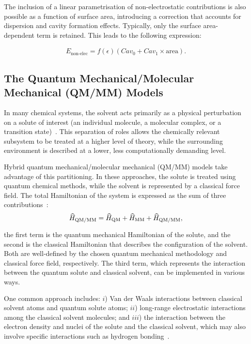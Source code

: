 The inclusion of a linear parametrisation of non-electrostatic contributions is
also possible as a function of surface area, introducing a correction that
accounts for dispersion and cavity formation effects. Typically, only the
surface area-dependent term is retained. This leads to the following
expression:

\begin{align}
  E_\text{non-elec} = f(\epsilon)\left(Cav_0 + Cav_1\times\text{area}\right).
\end{align}

\subsection{The Quantum Mechanical/Molecular Mechanical (QM/MM) Models}

In many chemical systems, the solvent acts primarily as a physical
perturbation on a solute of interest (an individual molecule, a
molecular complex, or a transition state)~\cite{Monard2017}. This separation of
roles allows the chemically relevant subsystem to be treated at a higher level
of theory, while the surrounding environment is described at a lower, less
computationally demanding level.

Hybrid quantum mechanical/molecular mechanical (QM/MM) models take advantage of
this partitioning. In these approaches, the solute is treated using quantum
chemical methods, while the solvent is represented by a classical force field.
The total Hamiltonian of the system is expressed as the sum of three
contributions~\cite{Monard2003}:
%
\begin{align}
  \widehat{H}_\text{QM/MM} = \widehat{H}_\text{QM} + \widehat{H}_\text{MM} + \widehat{H}_\text{QM/MM},
\end{align}

\noindent the first term is the quantum mechanical Hamiltonian of the solute, and the
second is the classical Hamiltonian that describes the configuration of the
solvent. Both are well-defined by the chosen quantum mechanical methodology and
classical force field, respectively. The third term, which represents the
interaction between the quantum solute and classical solvent, can be
implemented in various ways.

\newpage
One common approach includes: $i$) Van der Waals interactions between classical
solvent atoms and quantum solute atoms; $ii$) long-range electrostatic
interactions among the classical solvent molecules; and $iii$) the interaction
between the electron density and nuclei of the solute and the classical
solvent, which may also involve specific interactions such as hydrogen
bonding~\cite{Monard2017}.

